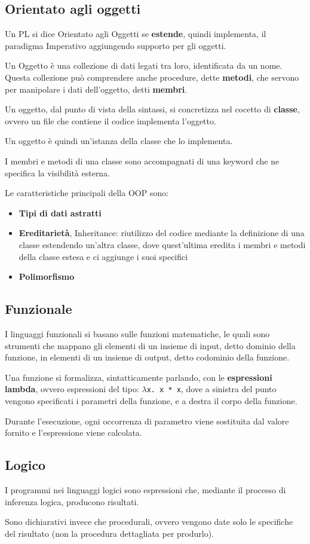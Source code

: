 \documentclass[12pt,a4paper]{article}
\begin{document}
\subsection{Orientato agli oggetti}
Un PL si dice Orientato agli Oggetti se \textbf{estende}, quindi implementa, il paradigma Imperativo aggiungendo supporto per gli oggetti.


Un Oggetto è una collezione di dati legati tra loro, identificata da un nome. Questa collezione può comprendere anche procedure, dette \textbf{metodi}, che servono per manipolare i dati dell'oggetto, detti \textbf{membri}.

Un oggetto, dal punto di vista della sintassi, si concretizza nel cocetto di \textbf{classe}, ovvero un file che contiene il codice implementa l'oggetto.

Un oggetto è quindi un'istanza della classe che lo implementa.

I membri e metodi di una classe sono accompagnati di una keyword che ne specifica la visibilità esterna.

Le caratteristiche principali della OOP sono:
\begin{itemize}
\item \textbf{Tipi di dati astratti}
\item \textbf{Ereditarietà}, Inheritance: riutilizzo del codice mediante la definizione di una classe estendendo un'altra classe, dove quest'ultima eredita i membri e metodi della classe estesa e ci aggiunge i suoi specifici
\item \textbf{Polimorfismo}
\end{itemize}

\subsection{Funzionale}
I linguaggi funzionali si basano sulle funzioni matematiche, le quali sono strumenti che mappano gli elementi di un insieme di input, detto dominio della funzione, in elementi di un insieme di output, detto codominio della funzione.

Una funzione si formalizza, sintatticamente parlando, con le \textbf{espressioni lambda}, ovvero espressioni del tipo: \texttt{$\lambda$x. x * x}, dove a sinistra del punto vengono specificati i parametri della funzione, e a destra il corpo della funzione.

Durante l'esecuzione, ogni occorrenza di parametro viene sostituita dal valore fornito e l'espressione viene calcolata.

\subsection{Logico}
I programmi nei linguaggi logici sono espressioni che, mediante il processo di inferenza logica, producono risultati.

Sono dichiarativi invece che procedurali, ovvero vengono date solo le specifiche del risultato (non la procedura dettagliata per produrlo).
\end{document}
